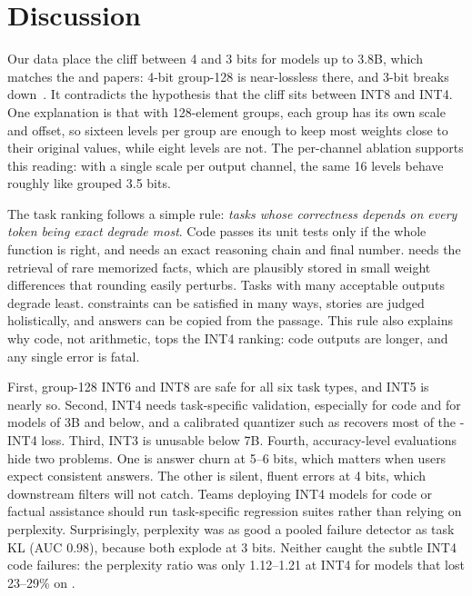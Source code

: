 \section{Discussion}
\label{sec:discussion}

 Our data place the cliff between 4 and 3 bits for models up to 3.8B, which matches the \gptq and \awq papers: 4-bit group-128 is near-lossless there, and 3-bit \rtn breaks down~\cite{frantar2023gptq,lin2024awq}. It contradicts the hypothesis that the cliff sits between INT8 and INT4. One explanation is that with 128-element groups, each group has its own scale and offset, so sixteen levels per group are enough to keep most weights close to their original values, while eight levels are not. The per-channel ablation supports this reading: with a single scale per output channel, the same 16 levels behave roughly like grouped 3.5 bits.

 The task ranking follows a simple rule: \emph{tasks whose correctness depends on every token being exact degrade most}. Code passes its unit tests only if the whole function is right, and \gsm needs an exact reasoning chain and final number. \trivia needs the retrieval of rare memorized facts, which are plausibly stored in small weight differences that rounding easily perturbs. Tasks with many acceptable outputs degrade least. \ifeval constraints can be satisfied in many ways, stories are judged holistically, and \squad answers can be copied from the passage. This rule also explains why code, not arithmetic, tops the INT4 ranking: code outputs are longer, and any single error is fatal.

 First, group-128 INT6 and INT8 are safe for all six task types, and INT5 is nearly so. Second, INT4 needs task-specific validation, especially for code and for models of 3B and below, and a calibrated quantizer such as \awq recovers most of the \rtn-INT4 loss. Third, \rtn INT3 is unusable below 7B. Fourth, accuracy-level evaluations hide two problems. One is answer churn at 5--6 bits, which matters when users expect consistent answers. The other is silent, fluent errors at 4 bits, which downstream filters will not catch. Teams deploying INT4 models for code or factual assistance should run task-specific regression suites rather than relying on perplexity. Surprisingly, \wikitext perplexity was as good a pooled failure detector as task KL (AUC 0.98), because both explode at 3 bits. Neither caught the subtle INT4 code failures: the perplexity ratio was only 1.12--1.21 at INT4 for models that lost 23--29\% on \humaneval.

